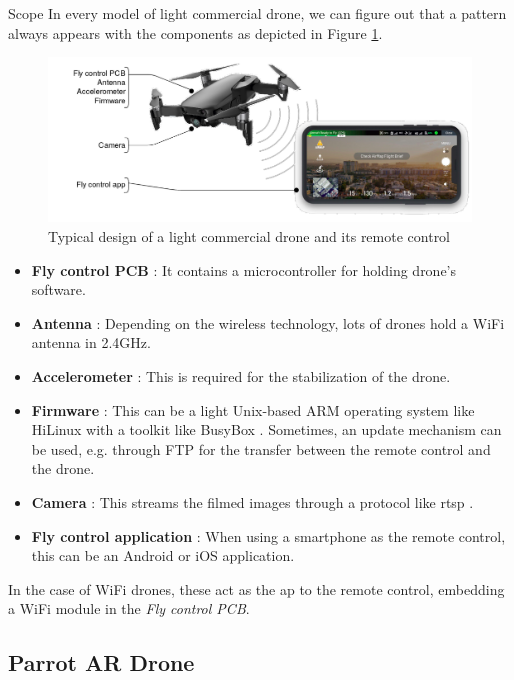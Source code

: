 \begin{chaptercover}{Scope}
In every model of light commercial drone, we can figure out that a pattern always appears with the components as depicted in Figure \ref{fig:drone-design}.

\begin{figure}[H]
  \centering
  \includegraphics[width=\linewidth]{figures/drone-design}
  \caption{Typical design of a light commercial drone and its remote control}
  \label{fig:drone-design}
\end{figure}

\begin{itemize}
  \item \textbf{Fly control PCB} : It contains a microcontroller for holding drone's software.
  \item \textbf{Antenna} : Depending on the wireless technology, lots of drones hold a WiFi antenna in 2.4GHz.
  \item \textbf{Accelerometer} : This is required for the stabilization of the drone.
  \item \textbf{Firmware} : This can be a light Unix-based ARM operating system like HiLinux \cite{hilinux} with a toolkit like BusyBox \cite{busybox}. Sometimes, an update mechanism can be used, e.g. through FTP for the transfer between the remote control and the drone.
  \item \textbf{Camera} : This streams the filmed images through a protocol like \acrshort{rtsp} \cite{rfc7826}.
  \item \textbf{Fly control application} : When using a smartphone as the remote control, this can be an Android or iOS application.
\end{itemize}

In the case of WiFi drones, these act as the \acrfull{ap} to the remote control, embedding a WiFi module in the \textit{Fly control PCB}.

\subsection{Parrot AR Drone}


\end{chaptercover}
